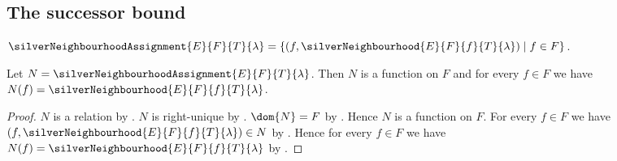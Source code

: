 \subsection{The successor bound}

\begin{definition}\label{silver_neighbourhood_assignment}
    $\silverNeighbourhoodAssignment{E}{F}{T}{\lambda}
        =\{(f,\silverNeighbourhood{E}{F}{f}{T}{\lambda})\mid f\in F\}$.
\end{definition}

\begin{proposition}\label{silver_neighbourhood_assignment_type}
    Let $N=\silverNeighbourhoodAssignment{E}{F}{T}{\lambda}$.
    Then $N$ is a function on $F$ and for every $f\in F$ we have
        $N(f)=\silverNeighbourhood{E}{F}{f}{T}{\lambda}$.
\end{proposition}
\begin{proof}
    $N$ is a relation by .
    $N$ is right-unique
        by .
    $\dom{N}=F$
        by .
    Hence $N$ is a function on $F$.
    For every $f\in F$ we have
        $(f,\silverNeighbourhood{E}{F}{f}{T}{\lambda})\in N$
        by .
    Hence for every $f\in F$ we have
        $N(f)=\silverNeighbourhood{E}{F}{f}{T}{\lambda}$
        by .
\end{proof}


